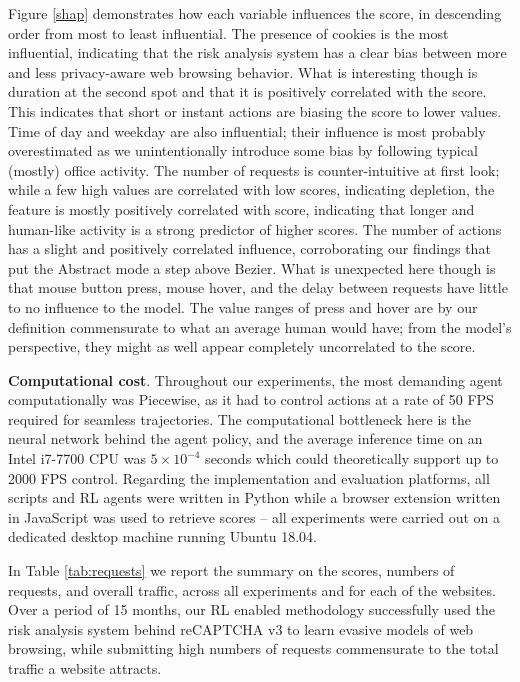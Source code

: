 Figure \ref{shap} demonstrates how each variable influences the score, in descending order from most to least influential.
The presence of cookies is the most influential, indicating that the risk analysis system has a clear bias between more and less privacy-aware web browsing behavior.
What is interesting though is duration at the second spot and that it is positively correlated with the score.
This indicates that short or instant actions are biasing the score to lower values.
Time of day and weekday are also influential; their influence is most probably overestimated as we unintentionally introduce some bias by following typical (mostly) office activity.
The number of requests is counter-intuitive at first look; while a few high values are correlated with low scores, indicating depletion, the feature is mostly positively correlated with score, indicating that longer and human-like activity is a strong predictor of higher scores.
The number of actions has a slight and positively correlated influence, corroborating our findings that put the Abstract mode a step above Bezier.
What is unexpected here though is that mouse button press, mouse hover, and the delay between requests have little to no influence to the model.
The value ranges of press and hover are by our definition commensurate to what an average human would have; from the model's perspective, they might as well appear completely uncorrelated to the score.

\textbf{Computational cost}. Throughout our experiments, the most demanding agent computationally was Piecewise, as it had to control actions at a rate of 50 FPS required for seamless trajectories.
The computational bottleneck here is the neural network behind the agent policy, and the average inference time on an Intel i7-7700 CPU was $5 \times 10^{-4}$ seconds which could theoretically support up to 2000 FPS control.
Regarding the implementation and evaluation platforms, all scripts and \gls{RL} agents were written in Python while a browser extension written in JavaScript was used to retrieve scores -- all experiments were carried out on a dedicated desktop machine running Ubuntu 18.04.

In Table \ref{tab:requests} we report the summary on the scores, numbers of requests, and overall traffic, across all experiments and for each of the websites.
Over a period of 15 months, our \gls{RL} enabled methodology successfully used the risk analysis system behind reCAPTCHA v3 to learn evasive models of web browsing, while submitting high numbers of requests commensurate to the total traffic a website attracts.

